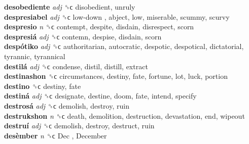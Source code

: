 \textbf{desobediente} \emph{adj}  ␝ϲ  disobedient, unruly  \\
\textbf{despresiabel} \emph{adj}  ␝ϲ   low-down , abject, low, miserable, scummy, scurvy  \\
\textbf{despresio} \emph{n}  ␝ϲ  contempt, despite, disdain, disrespect, scorn  \\
\textbf{despresiá} \emph{adj}  ␝ϲ  contemn, despise, disdain, scorn  \\
\textbf{despótiko} \emph{adj}  ␝ϲ  authoritarian, autocratic, despotic, despotical, dictatorial, tyrannic, tyrannical  \\
\textbf{destilá} \emph{adj}  ␝ϲ  condense, distil, distill, extract  \\
\textbf{destinashon} ␝ϲ  circumstances, destiny, fate, fortune, lot, luck, portion  \\
\textbf{destino} ␝ϲ  destiny, fate  \\
\textbf{destiná} \emph{adj}  ␝ϲ  designate, destine, doom, fate, intend, specify  \\
\textbf{destrosá} \emph{adj}  ␝ϲ  demolish, destroy, ruin  \\
\textbf{destrukshon} \emph{n}  ␝ϲ  death, demolition, destruction, devastation, end, wipeout  \\
\textbf{destruí} \emph{adj}  ␝ϲ  demolish, destroy, destruct, ruin  \\
\textbf{desèmber} \emph{n}  ␝ϲ   Dec ,  December   \\
